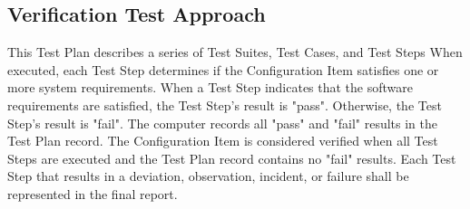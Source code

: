 \subsection{Verification Test Approach}
This Test Plan describes a series of Test Suites, Test Cases, and Test Steps
When executed, each Test Step determines if the Configuration Item satisfies one
or more system requirements.  When a Test Step indicates that the software
requirements are satisfied, the Test Step's result is "pass".  Otherwise, the
Test Step's result is "fail".  The computer records all "pass" and "fail"
results in the Test Plan record.  The Configuration Item is considered
verified when all Test Steps are executed and the Test Plan record contains
no "fail" results.  Each Test Step that results in a deviation, observation,
incident, or failure shall be represented in the final report.
